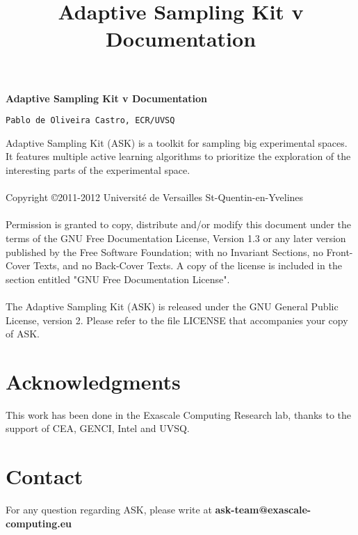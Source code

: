 \documentclass[a4]{report}
\begin{document}
\title{Adaptive Sampling Kit v Documentation}

\maketitle
\tableofcontents

\break
 \begin{center}

   \textbf{Adaptive Sampling Kit v Documentation} 

 \bigskip
     \texttt{Pablo de Oliveira Castro, ECR/UVSQ}
 \bigskip
 
\end{center}

Adaptive Sampling Kit (ASK) is a toolkit for sampling big experimental spaces. It features multiple active learning algorithms to prioritize the exploration of the interesting parts of the experimental space.

\paragraph{}
\noindent Copyright \copyright2011-2012 Universit\'e de Versailles St-Quentin-en-Yvelines
\paragraph{}
\noindent Permission is granted to copy, distribute and/or modify this document
under the terms of the GNU Free Documentation License, Version 1.3
or any later version published by the Free Software Foundation;
with no Invariant Sections, no Front-Cover Texts, and no Back-Cover Texts.
A copy of the license is included in the section entitled "GNU
Free Documentation License".
\paragraph{}
The Adaptive Sampling Kit (ASK) is released under the GNU 
General Public License, version 2. Please refer to the file LICENSE that 
accompanies your copy of ASK. 


\section*{Acknowledgments}
This work has been done in the Exascale Computing Research lab, thanks to the support of CEA, GENCI, Intel and UVSQ.

\section*{Contact}
For any question regarding ASK, please write at \textbf{ask-team@exascale-computing.eu}
\end{document}
